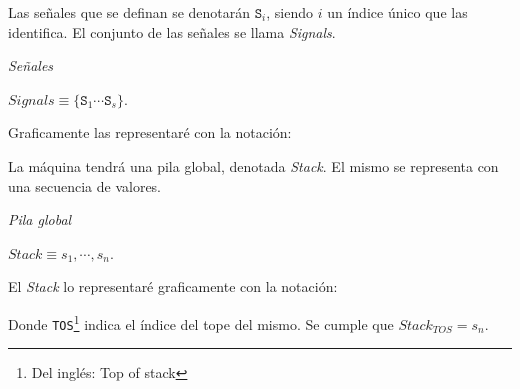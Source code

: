   

  Las señales que se definan se denotarán $\texttt{S}_i$, siendo $i$ un
  índice único que las identifica. El conjunto de las señales se llama
  \textit{Signals}.

\begin{definicion}
  \textit{Señales}
  \begin{center}
    $\textit{Signals} \equiv \{\texttt{S}_1 \dotsb \texttt{S}_s\}$.
  \end{center}
\end{definicion}

  Graficamente las representaré con la notación:

  

  La máquina tendrá una pila global, denotada \textit{Stack}. El mismo
  se representa con una secuencia de valores.

\begin{definicion}
  \textit{Pila global}
  \begin{center}
    $\textit{Stack} \equiv s_1, \dotsb, s_n$.
  \end{center}
\end{definicion}

  El \textit{Stack} lo representaré graficamente con la notación:

  

  Donde \texttt{TOS}\footnote{Del inglés: Top
  of stack} indica el índice del tope del mismo.
  Se cumple que $\textit{Stack}_{TOS} = s_n$.





